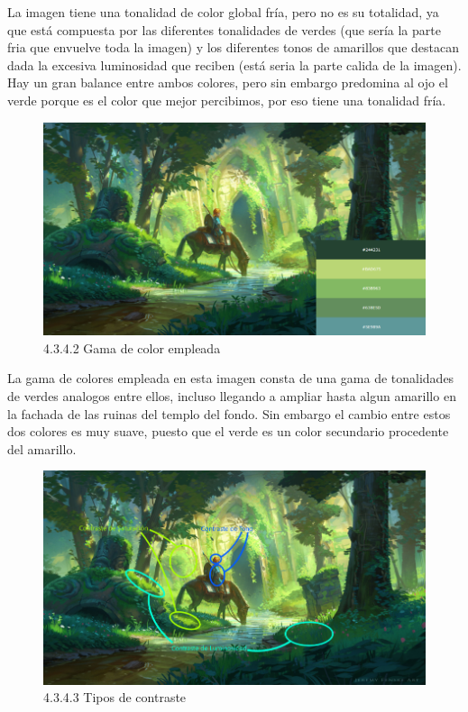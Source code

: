 \documentclass[12pt]{article}
\begin{document}
La imagen tiene una tonalidad de color global fría, pero no es su totalidad, ya que está compuesta por las diferentes tonalidades de verdes (que sería la parte fria que envuelve toda la imagen) y los diferentes tonos de amarillos que destacan dada la excesiva luminosidad que reciben (está seria la parte calida de la imagen). Hay un gran balance entre ambos colores, pero sin embargo predomina al ojo el verde porque es el color que mejor percibimos, por eso tiene una tonalidad fría.

    \begin{figure}[H]
      \centering
      \includegraphics[scale=0.7]{images/Saúl/Sección 3/EA_img3_4Color_2GamaColores.png}
      \caption{\small 4.3.4.2 Gama de color empleada}
    \end{figure}

La gama de colores empleada en esta imagen consta de una gama de tonalidades de verdes analogos entre ellos, incluso llegando a ampliar hasta algun amarillo en la fachada de las ruinas del templo del fondo. Sin embargo el cambio entre estos dos colores es muy suave, puesto que el verde es un color secundario procedente del amarillo.

    \begin{figure}[H]
      \centering
      \includegraphics[scale=0.7]{images/Saúl/Sección 3/EA_img3_4Color_3Contrastes.png}
      \caption{\small 4.3.4.3 Tipos de contraste}
    \end{figure}
\end{document}
